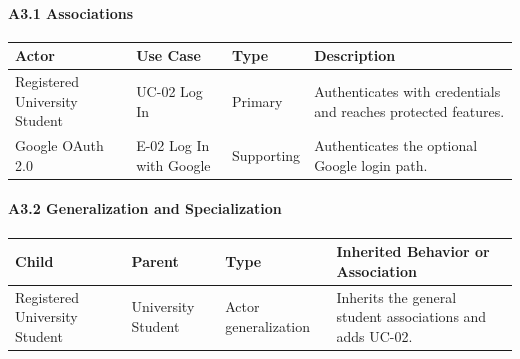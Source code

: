 \documentclass[12pt]{article}
\renewcommand{\baselinestretch}{1.5}
\begin{document}
\hypertarget{sec:a3-1-associations}{}
\paragraph*{A3.1 Associations}
\par\medskip

\begingroup
\small
\renewcommand{\baselinestretch}{1.0}\selectfont
\renewcommand{\arraystretch}{1.15}
\setlength{\tabcolsep}{6pt}
\begin{longtable}{|>{\raggedright\arraybackslash}p{}|>{\raggedright\arraybackslash}p{}|>{\raggedright\arraybackslash}p{}|>{\raggedright\arraybackslash}p{}|}
\hline
\textbf{Actor} & \textbf{Use Case} & \textbf{Type} & \textbf{Description} \\ \hline
\endhead
Registered University Student & UC-02 Log In & Primary & Authenticates with credentials and reaches protected features. \\ \hline
Google OAuth 2.0 & E-02 Log In with Google & Supporting & Authenticates the optional Google login path. \\ \hline
\end{longtable}
\endgroup
\par\medskip

\hypertarget{sec:a3-2-generalization-and-specialization}{}
\paragraph*{A3.2 Generalization and Specialization}
\par\medskip

\begingroup
\small
\renewcommand{\baselinestretch}{1.0}\selectfont
\renewcommand{\arraystretch}{1.15}
\setlength{\tabcolsep}{6pt}
\begin{longtable}{|>{\raggedright\arraybackslash}p{}|>{\raggedright\arraybackslash}p{}|>{\raggedright\arraybackslash}p{}|>{\raggedright\arraybackslash}p{}|}
\hline
\textbf{Child} & \textbf{Parent} & \textbf{Type} & \textbf{Inherited Behavior or Association} \\ \hline
\endhead
Registered University Student & University Student & Actor generalization & Inherits the general student associations and adds UC-02. \\ \hline
\end{longtable}
\endgroup
\par\medskip

\hypertarget{sec:a3-3-include}{}
\end{document}
